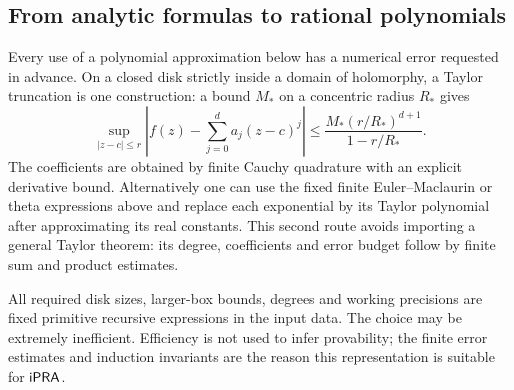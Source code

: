 \subsection{From analytic formulas to rational polynomials}
Every use of a polynomial approximation below has a numerical error
requested in advance. On a closed disk strictly inside a domain of
holomorphy, a Taylor truncation is one construction: a bound $M_*$ on
a concentric radius $R_*$ gives
\[
 \sup_{|z-c|\le r}\left|f(z)-\sum_{j=0}^d a_j(z-c)^j\right|
 \le\frac{M_* (r/R_*)^{d+1}}{1-r/R_*}.
\]
The coefficients are obtained by finite Cauchy quadrature with an
explicit derivative bound. Alternatively one can use the fixed finite
Euler--Maclaurin or theta expressions above and replace each exponential
by its Taylor polynomial after approximating its real constants.
This second route avoids importing a general Taylor theorem: its degree,
coefficients and error budget follow by finite sum and product estimates.

All required disk sizes, larger-box bounds, degrees and working
precisions are fixed primitive recursive expressions in the input data.
The choice may be extremely inefficient. Efficiency is not used to
infer provability; the finite error estimates and induction invariants
are the reason this representation is suitable for $\mathsf{iPRA}$.
